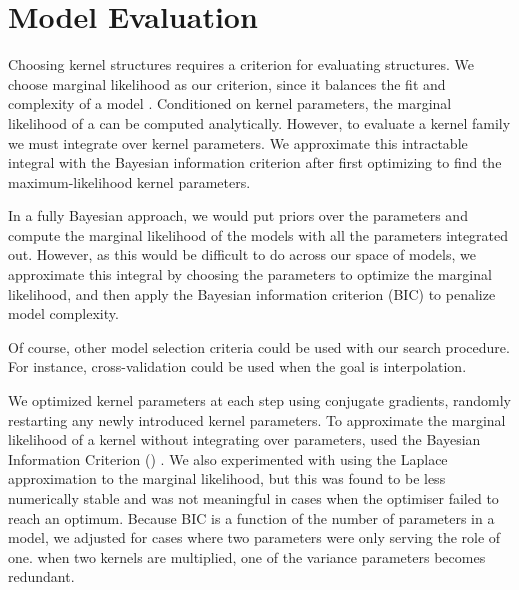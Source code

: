 \section{Model Evaluation}

Choosing kernel structures requires a criterion for evaluating structures.
We choose marginal likelihood as our criterion, since it balances the fit and complexity of a model \citep{rasmussen2001occam}.
Conditioned on kernel parameters, the marginal likelihood of a \gp{} can be computed analytically.
However, to evaluate a kernel family we must integrate over kernel parameters.
We approximate this intractable integral with the Bayesian information criterion \citep{schwarz1978estimating} after first optimizing to find the maximum-likelihood kernel parameters.

In a fully Bayesian approach, we would put priors over the parameters and compute the marginal likelihood of the models with all the parameters integrated out.
However, as this would be difficult to do across our space of models, we approximate this integral by choosing the parameters to optimize the marginal likelihood, and then apply the Bayesian information criterion (BIC) to penalize model complexity.

Of course, other model selection criteria could be used with our search procedure.
For instance, cross-validation could be used when the goal is interpolation.





We optimized kernel parameters at each step using conjugate gradients, randomly restarting any newly introduced kernel parameters.  To approximate the marginal likelihood of a kernel without integrating over parameters, used the Bayesian Information Criterion (\BIC{}) \citep{schwarz1978estimating}.
We also experimented with using the Laplace approximation to the marginal likelihood, but this was found to be less numerically stable and was not meaningful in cases when the optimiser failed to reach an optimum.
Because BIC is a function of the number of parameters in a model, we adjusted for cases where two parameters were only serving the role of one.  \eg when two kernels are multiplied, one of the variance parameters becomes redundant.

